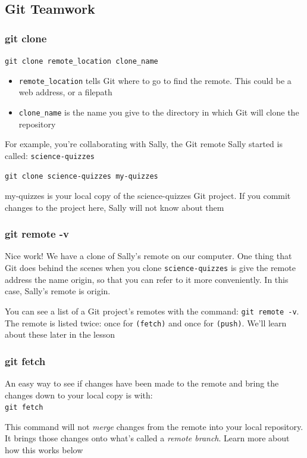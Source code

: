 \documentclass[a4paper, 12pt]{article}
\begin{document}
\subsection{Git Teamwork}
\subsubsection{git clone}
\verb|git clone remote_location clone_name|

\begin{itemize}
\item \verb|remote_location| tells Git where to go to find the remote. This could be a web address, or a filepath

\item \verb|clone_name| is the name you give to the directory in which Git will clone the repository

\end{itemize}

For example, you're collaborating with Sally, the Git remote Sally started is called: \verb|science-quizzes|

\verb|git clone science-quizzes my-quizzes| 

my-quizzes is your local copy of the science-quizzes Git project. If you commit changes to the project here, Sally will not know about them

\subsubsection{git remote -v}
Nice work! We have a clone of Sally's remote on our computer. One thing that Git does behind the scenes when you clone \verb|science-quizzes| is give the remote address the name origin, so that you can refer to it more conveniently. In this case, Sally's remote is origin.

You can see a list of a Git project's remotes with the command: \verb|git remote -v|. The remote is listed twice: once for \verb|(fetch)| and once for \verb|(push)|. We'll learn about these later in the lesson

\subsubsection{git fetch}
An easy way to see if changes have been made to the remote and bring the changes down to your local copy is with:\\ \verb|git fetch|

This command will not \textit{merge} changes from the remote into your local repository. It brings those changes onto what's called a \textit{remote branch}. Learn more about how this works below
\end{document}
